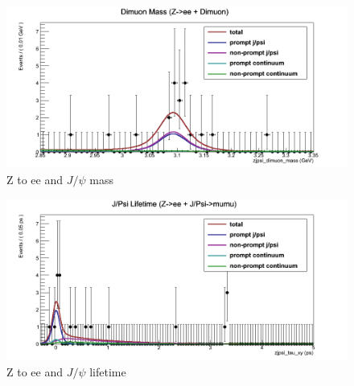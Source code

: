 \documentclass[a4paper,12pt]{article}
\begin{document}
\begin{figure}[]
    \centering
      \includegraphics[scale=0.4]{Images/ztoee_jpsi_dimuon_mass0.png}
    \caption{Z to ee and $J\slash\psi$ mass}
\end{figure}
\begin{figure}[]
    \centering
      \includegraphics[scale=0.4]{Images/ztoee_jpsi_tau_xy0.png}
    \caption{Z to ee and $J\slash\psi$ lifetime}
\end{figure}
\end{document}
